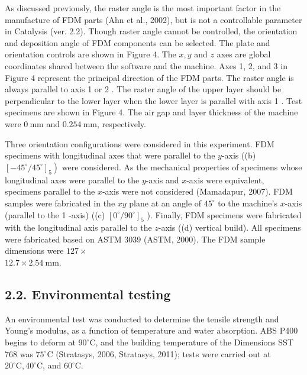 \documentclass[10pt]{article}
\begin{document}
As discussed previously, the raster angle is the most important factor in the manufacture of FDM parts (Ahn et al., 2002), but is not a controllable parameter in Catalysis (ver. 2.2). Though raster angle cannot be controlled, the orientation and deposition angle of FDM components can be selected. The plate and orientation controls are shown in Figure 4. The $x, y$ and $z$ axes are global coordinates shared between the software and the machine. Axes 1, 2, and 3 in Figure 4 represent the principal direction of the FDM parts. The raster angle is always parallel to axis 1 or 2 . The raster angle of the upper layer should be perpendicular to the lower layer when the lower layer is parallel with axis 1 . Test specimens are shown in Figure 4. The air gap and layer thickness of the machine were $0 \mathrm{~mm}$ and $0.254 \mathrm{~mm}$, respectively.

Three orientation configurations were considered in this experiment. FDM specimens with longitudinal axes that were parallel to the $y$-axis ((b) $\left.\left[-45^{\circ} / 45^{\circ}\right]_{5}\right)$ were considered. As the mechanical properties of specimens whose longitudinal axes were parallel to the $y$-axis and $x$-axis were equivalent, specimens parallel to the $x$-axis were not considered (Mamadapur, 2007). FDM samples were fabricated in the $x y$ plane at an angle of $45^{\circ}$ to the machine's $x$-axis (parallel to the 1 -axis) ((c) $\left[0^{\circ} / 90^{\circ}\right]_{5}$ ). Finally, FDM specimens were fabricated with the longitudinal axis parallel to the $z$-axis ((d) vertical build). All specimens were fabricated based on ASTM 3039 (ASTM, 2000). The FDM sample dimensions were $127 \times$\\
$12.7 \times 2.54 \mathrm{~mm}$.

\subsection*{2.2. Environmental testing}
An environmental test was conducted to determine the tensile strength and Young's modulus, as a function of temperature and water absorption. ABS P400 begins to deform at $90^{\circ} \mathrm{C}$, and the building temperature of the Dimensions SST 768 was $75^{\circ} \mathrm{C}$ (Stratasys, 2006, Stratasys, 2011); tests were carried out at $20^{\circ} \mathrm{C}, 40^{\circ} \mathrm{C}$, and $60^{\circ} \mathrm{C}$.
\end{document}
